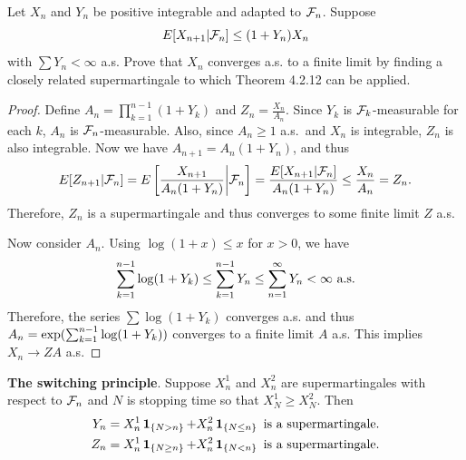 \documentclass[a4paper]{article}
\begin{document}
\begin{ex}[Durret 4.2.8]
  Let $X_n$ and $Y_n$ be positive integrable and adapted to $\mathcal{F}_n$.
  Suppose 
  \[
  E[X_{n + 1} | \mathcal{F}_n] \leq (1 + Y_n) X_n
  \]
  with $\sum Y_n < \infty$ a.s. Prove that $X_n$ converges a.s. to a finite
  limit by finding a closely related supermartingale to which 
  Theorem 4.2.12 can be applied.
\end{ex}

\begin{proof}
  Define $A_n = \prod_{k=1}^{n-1} (1 + Y_k)$ and $Z_n = \frac{X_n}{A_n}$.
  Since $Y_k$ is $\mathcal{F}_k$-measurable for each $k$, $A_n$ is 
  $\mathcal{F}_n$-measurable. 
  Also, since $A_n \geq 1$ a.s.\ and $X_n$ 
  is integrable, $Z_n$ is also integrable. Now we have
  $A_{n + 1} = A_n (1 + Y_n)$, and thus 
  \begin{align*}
    E[Z_{n + 1} | \mathcal{F}_n]
    = E \left[ \frac{X_{n + 1}}{A_n (1 + Y_n)} \middle| \mathcal{F}_n \right]
    = \frac{E[X_{n + 1} | \mathcal{F}_n]}{A_n (1 + Y_n)} 
    \leq \frac{X_n}{A_n}
    = Z_n.
  \end{align*}
  Therefore, $Z_n$ is a supermartingale and thus converges to some 
  finite limit $Z$ a.s.

  Now consider $A_n$. Using $\log (1 + x) \leq x$ for $x > 0$, we have 
  \[
  \sum_{k=1}^{n-1} \log (1 + Y_k)
  \leq \sum_{k=1}^{n - 1} Y_n
  \leq \sum_{n=1}^\infty Y_n < \infty \text{ a.s.}
  \]
  Therefore, the series $\sum \log(1 + Y_k)$ converges a.s.
  and thus $A_n = \exp (\sum_{k=1}^{n-1} \log(1 + Y_k))$ converges
  to a finite limit $A$ a.s. This implies $X_n \to Z A$ a.s.

\end{proof}

\begin{ex}[Durret 4.2.9]
  \textbf{The switching principle}. Suppose $X_n^1$ and $X_n^2$ are 
  supermartingales with respect to $\mathcal{F}_n$ and $N$ is stopping time 
  so that $X_N^1 \geq X_N^2$. Then 
  \begin{align*}
    Y_n = X_n^1 \operatorname{\mathbf{1}}_{\{N > n\}} + X_n^2 \operatorname{\mathbf{1}}_{\{N \leq n\}}
    \text{ is a supermartingale.} \\
    Z_n = X_n^1 \operatorname{\mathbf{1}}_{\{N \geq n\}} + X_n^2 \operatorname{\mathbf{1}}_{\{N < n\}}
    \text{ is a supermartingale.} \\
  \end{align*}
\end{ex}
\end{document}
